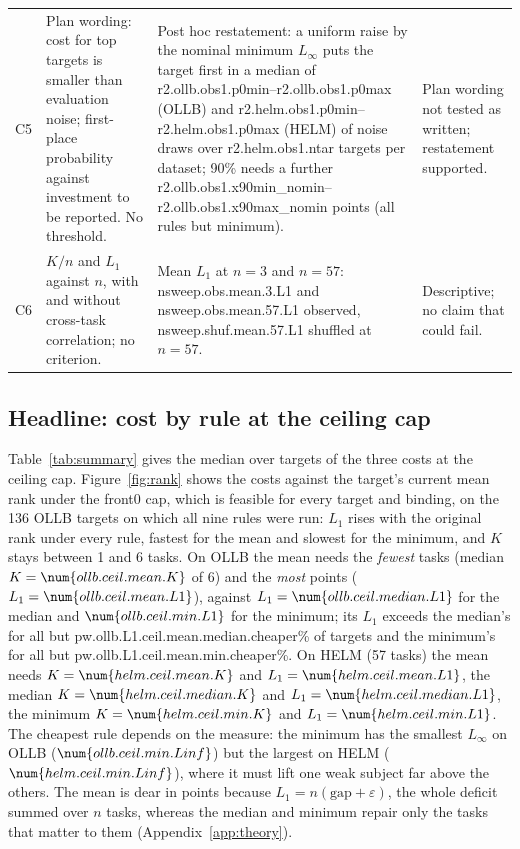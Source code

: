 \begin{table}[t]
\begin{tabular}{@{}p{0.3in} p{1.4in} p{2.3in} p{0.8in}@{}}
C5 & Plan wording: cost for top targets is smaller than evaluation noise; first-place probability against investment to be reported. No threshold. & Post hoc restatement: a uniform raise by the nominal minimum $L_\infty$ puts the target first in a median of \num{r2.ollb.obs1.p0min}--\num{r2.ollb.obs1.p0max} (OLLB) and \num{r2.helm.obs1.p0min}--\num{r2.helm.obs1.p0max} (HELM) of noise draws over \num{r2.helm.obs1.ntar} targets per dataset; 90\% needs a further \num{r2.ollb.obs1.x90min_nomin}--\num{r2.ollb.obs1.x90max_nomin} points (all rules but minimum). & Plan wording not tested as written; restatement supported. \\
C6 & $K/n$ and $L_1$ against $n$, with and without cross-task correlation; no criterion. & Mean $L_1$ at $n=3$ and $n=57$: \num{nsweep.obs.mean.3.L1} and \num{nsweep.obs.mean.57.L1} observed, \num{nsweep.shuf.mean.57.L1} shuffled at $n=57$. & Descriptive; no claim that could fail. \\
\bottomrule
\end{tabular}
\end{table}

\subsection{Headline: cost by rule at the ceiling cap}\label{sec:headline}
Table~\ref{tab:summary} gives the median over targets of the three costs at the ceiling cap. Figure~\ref{fig:rank} shows the costs against the target's current mean rank under the \textsf{front0} cap, which is feasible for every target and binding, on the 136 OLLB targets on which all nine rules were run: $L_1$ rises with the original rank under every rule, fastest for the mean and slowest for the minimum, and $K$ stays between 1 and 6 tasks.
On OLLB the mean needs the \emph{fewest} tasks (median $K=\num{ollb.ceil.mean.K}$ of 6) and the \emph{most} points ($L_1=\num{ollb.ceil.mean.L1}$), against $L_1=\num{ollb.ceil.median.L1}$ for the median and $\num{ollb.ceil.min.L1}$ for the minimum; its $L_1$ exceeds the median's for all but \num{pw.ollb.L1.ceil.mean.median.cheaper}\% of targets and the minimum's for all but \num{pw.ollb.L1.ceil.mean.min.cheaper}\%.
On HELM (57 tasks) the mean needs $K=\num{helm.ceil.mean.K}$ and $L_1=\num{helm.ceil.mean.L1}$, the median $K=\num{helm.ceil.median.K}$ and $L_1=\num{helm.ceil.median.L1}$, the minimum $K=\num{helm.ceil.min.K}$ and $L_1=\num{helm.ceil.min.L1}$.
The cheapest rule depends on the measure: the minimum has the smallest $L_\infty$ on OLLB ($\num{ollb.ceil.min.Linf}$) but the largest on HELM ($\num{helm.ceil.min.Linf}$), where it must lift one weak subject far above the others.
The mean is dear in points because $L_1=n(\text{gap}+\varepsilon)$, the whole deficit summed over $n$ tasks, whereas the median and minimum repair only the tasks that matter to them (Appendix~\ref{app:theory}).
